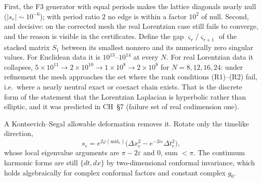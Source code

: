 \documentclass[11pt]{article}
\theoremstyle{definition}
\theoremstyle{plain}
\theoremstyle{remark}
\begin{document}
First, the F3 generator with equal periods makes the lattice diagonals nearly null (\(|s_e|\sim10^{-6}\)); with period ratio \(2\) no edge is within a factor \(10^{2}\) of null. Second, and decisive: on the corrected mesh the real Lorentzian case still fails to converge, and the reason is visible in the certificates. Define the gap \(\varsigma_r/\varsigma_{r+1}\) of the stacked matrix \(S_1\) between its smallest nonzero and its numerically zero singular values. For Euclidean data it is \(10^{13}\)--\(10^{14}\) at every \(N\). For real Lorentzian data it collapses, \(5\times10^{11}\to2\times10^{10}\to1\times10^{8}\to2\times10^{8}\) for \(N=8,12,16,24\): under refinement the mesh approaches the set where the rank conditions (R1)--(R2) fail, i.e.\ where a nearly neutral exact or coexact chain exists. That is the discrete form of the statement that the Lorentzian Laplacian is hyperbolic rather than elliptic, and it was predicted in CH~\S7 (failure set of real codimension one).

A Kontsevich--Segal allowable deformation removes it. Rotate only the timelike direction,
\[
s_e=e^{2\varphi(\mathrm{mid}_e)}\big(\Delta x_e^{2}-e^{-2i\varepsilon}\Delta t_e^{2}\big),
\]
whose local eigenvalue arguments are \(\pi-2\varepsilon\) and \(0\), sum \(<\pi\). The continuum harmonic forms are still \(\{dt,dx\}\) by two-dimensional conformal invariance, which holds algebraically for complex conformal factors and constant complex \(g_0\).
\end{document}
